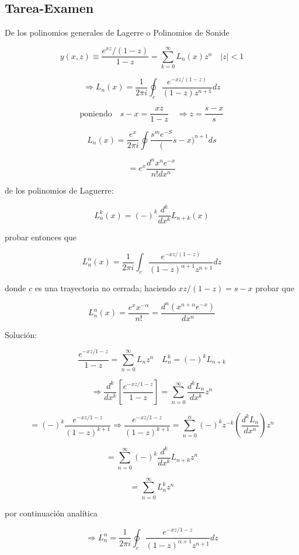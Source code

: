 \documentclass{report}
\begin{document}

\subsection{Tarea-Examen}

De los polinomios generales de Lagerre o Polinomios de Sonide 

\begin{equation}
y(x,z) \equiv \frac{e^{xz}/(1-z)}{1-z} = \sum _{k = 0}^{\infty} L _n (x) z^n \quad \vert z \vert <1 
\end{equation}

\[\Rightarrow L_n (x) = \frac{1}{2 \pi i} \oint _c \frac{e^{-x z/(1-z)}}{(1-z)z^{n+1}} dz \]

\[\text{poniendo} \quad s-x = \frac{xz}{1-z} \quad \Rightarrow z = \frac{s-x}{s}\]

\[L_n (x) = \frac{e^x }{2 \pi i} \oint \frac{s^{m} e^{-S}}(s-x)^{n+1} ds \]

\[= e^x \frac{d^n x^n e^{-x}}{n! dx^n }\]

de los polinomios de Laguerre:

\[L_{n}^{k} (x) = (-)^k \frac{d^k }{dx^k } L_{n+k} (x )\]

probar entonces que 

\[L_{n}^{\alpha } (x) = \frac{1}{2 \pi i} \int _c \frac{e^{-xz/(1-z)}}{(1-z)^{\alpha + 1} z^{n+1}} dz\]

donde $c$ es una trayectoria no cerrada; haciendo $xz/(1-z) = s-x$ probar que

\[L_{n}^{\alpha } (x) = \frac{e^x x^{- \alpha}}{n!} = \frac{d^n (x^{n+ \alpha} e^{-x})}{dx^n }\]

Solución: 


\[\frac{e^{-xz/1-z}}{1-z} = \sum_{n = 0}^{\infty } L_n z^n \quad 	L_{n}^{k} = (-)^k L_{n+k} \]

\[\Rightarrow \frac{d^k }{dx^k } [\frac{e^{-xz/1-z}}{1-z}] = \sum _{n= 0}^{\infty} \frac{d^k L_n }{dx^k } z^n \]

\[= (-)^k \frac{e^{-xz/1-z}}{(1-z)^{k+1}} \Rightarrow \frac{e^{-xz/1-z}}{(1-z)^{k+1}}  = \sum _{n=0}^{\alpha } (-)^k z^{-k} (\frac{d^k L_n }{dx^n })z^n  \]

\[= \sum _{n=0} ^{\infty } (-)^k \frac{d^k }{dx^k } L_{n+k} z^n \]

\[= \sum _{n=0}^{\infty } L_{n}^{k} z^n \]

por continuación analítica

\[\Rightarrow L_{n}^{\alpha} = \frac{1}{2 \pi i} \oint _c \frac{e^{-xz/1-z}}{(1-z)^{\alpha +1} z^{n+1}} dz  \]
\end{document}
